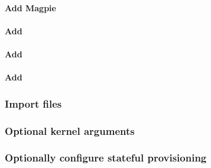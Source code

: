 \documentclass[letterpaper]{article}
\begin{document}
\paragraph{Add Magpie}


\paragraph{Add \conman{}} \label{sec:add_conman}


\paragraph{Add \nhc{}} \label{sec:add_nhc}



\vspace*{0.3cm}
\paragraph{Add \GEOPM{}} \label{sec:add_geopm}


\subsubsection{Import files} \label{sec:file_import}








\subsubsection{Optional kernel arguments} \label{sec:optional_kargs}




\vspace*{-0.1cm}
\subsubsection{Optionally configure stateful provisioning}


\end{document}
